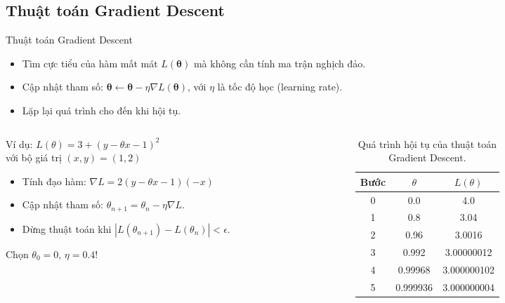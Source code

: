 \subsection{Thuật toán Gradient Descent}

\begin{frame}{Thuật toán Gradient Descent}
    \begin{itemize}
        \item Tìm cực tiểu của hàm mất mát \(L(\boldsymbol{\theta})\) mà không cần tính ma trận nghịch đảo.
        \item Cập nhật tham số: \(\boldsymbol{\theta} \leftarrow \boldsymbol{\theta} - \eta \nabla L(\boldsymbol{\theta})\), với \(\eta\) là tốc độ học (learning rate).
        \item Lặp lại quá trình cho đến khi hội tụ.
    \end{itemize}

\begin{columns}
    \begin{column}{0.5\textwidth}
        Ví dụ: \(L (\theta) = 3 + (y - \theta x - 1)^2\) \\
        với bộ giá trị \((x, y) = (1, 2)\)
        \begin{itemize}
            \item Tính đạo hàm: \(\nabla L = 2(y - \theta x - 1)(-x)\)
            \item Cập nhật tham số: \(\theta_{n+1} = \theta_n - \eta \nabla L\).
            \item Dừng thuật toán khi \(|L(\theta_{n+1}) - L(\theta_n)| < \epsilon\).
        \end{itemize}
    Chọn \(\theta_0 = 0\), \(\eta = 0.4\)!
    \end{column}
    \begin{column}{0.5\textwidth}
        \vspace{-8mm}
        \begin{table}
            \centering
            \caption{Quá trình hội tụ của thuật toán Gradient Descent.}
            \begin{tabular}{c|c|c}
                \hline
                Bước & \(\theta\) & \(L(\theta)\) \\
                \hline
                0 & 0.0 & 4.0 \\
                1 & 0.8 & 3.04 \\
                2 & 0.96 & 3.0016 \\
                3 & 0.992 & 3.00000012 \\
                4 & 0.99968 & 3.000000102 \\
                5 & 0.999936 & 3.000000004 \\
                \hline
            \end{tabular}
            \label{tab:gradient_descent}
        \end{table}
    \end{column}
\end{columns}
\end{frame}

